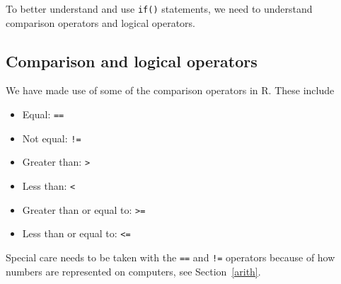 \documentclass[12pt,oneside]{book}\usepackage[]{graphicx}\usepackage[]{color}
\begin{document}
To better understand and use \verb+if()+ statements, we need to understand comparison operators and logical operators. 
\subsection{Comparison and logical operators}
We have made use of some of the comparison operators in R. These include
\begin{itemize}
\item Equal: \verb+==+
\item Not equal: \verb+!=+
\item Greater than: \verb+>+
\item Less than: \verb+<+
\item Greater than or equal to: \verb+>=+
\item Less than or equal to: \verb+<=+
\end{itemize}
Special care needs to be taken with the \verb+==+ and \verb+!=+ operators because of how numbers are represented on computers, see Section~\ref{arith}.
\end{document}
